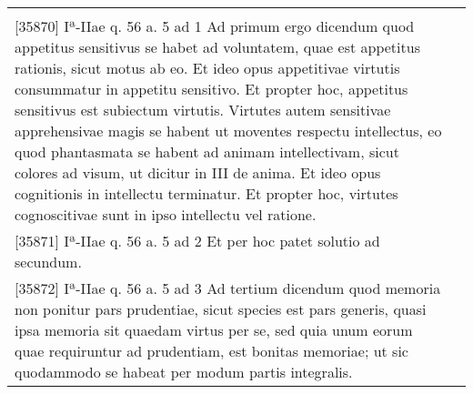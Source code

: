 \documentclass[10pt]{jsarticle}
\begin{document}
\begin{longtable}{p{21em}p{21em}}
&

\\


[35870] Iª-IIae q. 56 a. 5 ad 1
Ad primum ergo dicendum quod appetitus sensitivus se habet ad voluntatem, quae est appetitus rationis, sicut motus ab eo. Et ideo opus appetitivae virtutis consummatur in appetitu sensitivo. Et propter hoc, appetitus sensitivus est subiectum virtutis. Virtutes autem sensitivae apprehensivae magis se habent ut moventes respectu intellectus, eo quod phantasmata se habent ad animam intellectivam, sicut colores ad visum, ut dicitur in III de anima. Et ideo opus cognitionis in intellectu terminatur. Et propter hoc, virtutes cognoscitivae sunt in ipso intellectu vel ratione.

&

\\


[35871] Iª-IIae q. 56 a. 5 ad 2
Et per hoc patet solutio ad secundum.

&

\\


[35872] Iª-IIae q. 56 a. 5 ad 3
Ad tertium dicendum quod memoria non ponitur pars prudentiae, sicut species est pars generis, quasi ipsa memoria sit quaedam virtus per se, sed quia unum eorum quae requiruntur ad prudentiam, est bonitas memoriae; ut sic quodammodo se habeat per modum partis integralis.

&


\end{longtable}
\newpage
\end{document}
